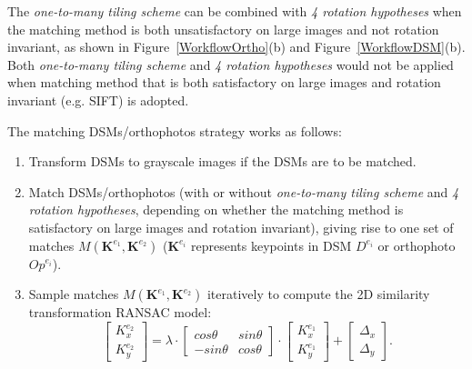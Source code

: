 The \textit{one-to-many tiling scheme} can be combined with \textit{4 rotation hypotheses} when the matching method is both unsatisfactory on large images and not rotation invariant, as shown in Figure~\ref{WorkflowOrtho}(b) and Figure~\ref{WorkflowDSM}(b).
Both \textit{one-to-many tiling scheme} and \textit{4 rotation hypotheses} would not be applied when matching method that is both satisfactory on large images and rotation invariant (e.g. SIFT) is adopted.
\par
The matching DSMs/orthophotos strategy works as follows:\\
\begin{enumerate}
    \item Transform DSMs to grayscale images if the DSMs are to be matched.
    \item Match DSMs/orthophotos (with or without \textit{one-to-many tiling scheme} and \textit{4 rotation hypotheses}, depending on whether the matching method is satisfactory on large images and rotation invariant), giving rise to one set of matches $M({\mathbf{K}^{e_1},\mathbf{K}^{e_2}})$ ($\mathbf{K}^{e_i}$ represents keypoints in DSM $D^{e_i}$ or orthophoto $Op^{e_i}$).
    \item Sample matches $M({\mathbf{K}^{e_1},\mathbf{K}^{e_2}})$ iteratively to compute the 2D similarity transformation RANSAC model:
\begin{equation}
\left [ \begin{array}{c}
{K}_x^{e_2}\\
{K}_y^{e_2}
\end{array}
\right ] =\lambda \cdot { \left[ \begin{array}{cc}
    cos\theta & sin\theta\\
    -sin\theta & cos\theta
    \end{array} 
    \right ]} \cdot {\left [ \begin{array}{c}
    {K}_x^{e_1}\\
    {K}_y^{e_1}
    \end{array}
    \right ]} + \left [ \begin{array}{c}
\Delta_x\\
\Delta_y
\end{array}
\right ]. \label{eq:2DSim}
\end{equation}


\end{enumerate}
